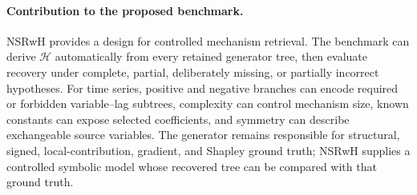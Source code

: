 \paragraph{Contribution to the proposed benchmark.}
NSRwH provides a design for controlled mechanism retrieval. The benchmark can
derive $\mathcal H$ automatically from every retained generator tree, then
evaluate recovery under complete, partial, deliberately missing, or partially
incorrect hypotheses. For time series, positive and negative branches can
encode required or forbidden variable--lag subtrees, complexity can control
mechanism size, known constants can expose selected coefficients, and symmetry
can describe exchangeable source variables. The generator remains responsible
for structural, signed, local-contribution, gradient, and Shapley ground truth;
NSRwH supplies a controlled symbolic model whose recovered tree can be compared
with that ground truth.

